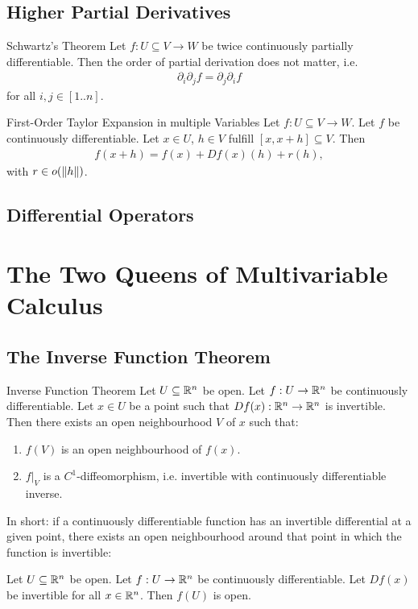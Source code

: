 \section{Higher Partial Derivatives}
\begin{importanttheorem}{Schwartz's Theorem}{}
	Let $f : U \subseteq V \to W$ be twice continuously partially differentiable. Then the order of partial derivation does not matter, i.e.
	\begin{align*}
		\partial_i \partial_j f = \partial_j \partial_i f
	\end{align*}
	for all $i,j \in [1..n]$.
\end{importanttheorem}
\begin{importanttheorem}{First-Order Taylor Expansion in multiple Variables}{}
	Let $f : U \subseteq V \to W$. Let $f$ be continuously differentiable. Let $x \in U$, $h \in V$ fulfill $[x,x+h] \subseteq V$. Then
	\begin{align*}
		f(x+h) = f(x) + Df(x)(h) + r(h),
	\end{align*}
	with $r \in o(\norm{h})$.
\end{importanttheorem}

\clearpage

\section{Differential Operators}
\chapter{The Two Queens of Multivariable Calculus}
\section{The Inverse Function Theorem}
\begin{importanttheorem}{Inverse Function Theorem}{}
	Let $U \subseteq \mathbb{R}^n$ be open. Let $f : U \to \mathbb{R}^n$ be continuously differentiable. Let $x \in U$ be a point such that $Df(x) : \mathbb{R}^n \to \mathbb{R}^n$ is invertible. Then there exists an open neighbourhood $V$ of $x$ such that:
	\begin{enumerate}
		\item $f(V)$ is an open neighbourhood of $f(x)$.
		\item $f|_V$ is a $C^1$-diffeomorphism, i.e. invertible with continuously differentiable inverse.
	\end{enumerate}
\end{importanttheorem}
In short: if a continuously differentiable function has an invertible differential at a given point, there exists an open neighbourhood around that point in which the function is invertible:
\begin{corollary}
	Let $U \subseteq \mathbb{R}^n$ be open. Let $f : U \to \mathbb{R}^n$ be continuously differentiable. Let $Df(x)$ be invertible for all $x \in \mathbb{R}^n$. Then $f(U)$ is open.
\end{corollary}
